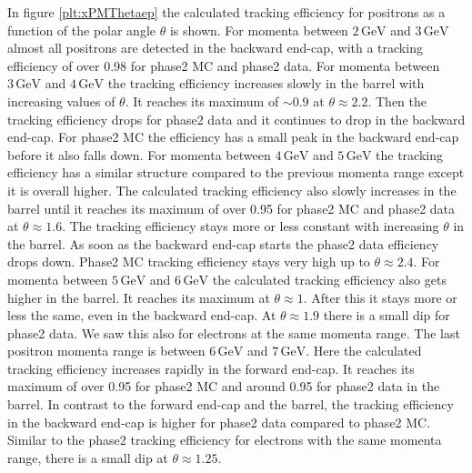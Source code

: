 \documentclass[a4paper,11pt,twosided,final,german,openbib,pdftex,listof=totoc,bibliography=totoc]{scrbook}
\begin{document}
In figure \ref{plt:xPMThetaep} the calculated tracking efficiency for positrons as a function of the polar angle $\theta$ is shown. For momenta between $2\,\textrm{GeV}$ and $3\,\textrm{GeV}$ almost all positrons are detected in the backward end-cap, with a tracking efficiency of over 0.98 for phase2 MC and phase2 data. 
For momenta between $3\,\textrm{GeV}$ and $4\,\textrm{GeV}$ the tracking efficiency increases slowly in the barrel with increasing values of $\theta$. It reaches its maximum of $\sim 0.9$ at $\theta \approx 2.2$. Then the tracking efficiency drops for phase2 data and it continues to drop in the backward end-cap. For phase2 MC the efficiency has a small peak in the backward end-cap before it also falls down. 
For momenta between $4\,\textrm{GeV}$ and $5\,\textrm{GeV}$ the tracking efficiency has a similar structure compared to the previous momenta range except it is overall higher. The calculated tracking efficiency also slowly increases in the barrel until it reaches its maximum of over 0.95 for phase2 MC and phase2 data at $\theta \approx 1.6$. The tracking efficiency stays more or less constant with increasing $\theta$ in the barrel. As soon as the backward end-cap starts the phase2 data efficiency drops down. Phase2 MC tracking efficiency stays very high up to $\theta \approx 2.4$.
For momenta between $5\,\textrm{GeV}$ and $6\,\textrm{GeV}$ the calculated tracking efficiency also gets higher in the barrel. It reaches its maximum at $\theta \approx 1$. After this it stays more or less the same, even in the backward end-cap. At $\theta \approx 1.9$ there is a small dip for phase2 data. We saw this also for electrons at the same momenta range.
The last positron momenta range is between $6\,\textrm{GeV}$ and $7\,\textrm{GeV}$. Here the calculated tracking efficiency increases rapidly in the forward end-cap. It reaches its maximum of over 0.95 for phase2 MC and around 0.95 for phase2 data in the barrel. In contrast to the forward end-cap and the barrel, the tracking efficiency in the backward end-cap is higher for phase2 data compared to phase2 MC. Similar to the phase2 tracking efficiency for electrons with the same momenta range, there is a small dip at $\theta \approx 1.25$.
\end{document}
